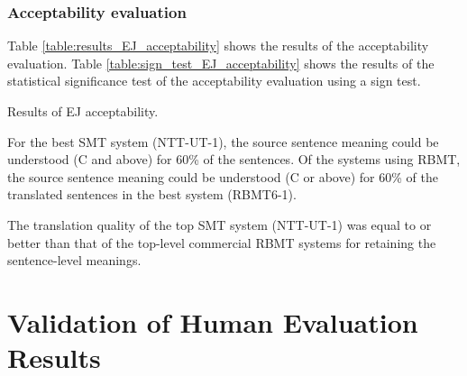 \documentclass[english]{jnlp_1.4}
\begin{document}
\subsubsection{Acceptability evaluation}

Table \ref{table:results_EJ_acceptability} shows the results of the acceptability evaluation. 
Table \ref{table:sign_test_EJ_acceptability} shows the results of the statistical significance test of the acceptability evaluation using a sign test.

\begin{table}[t]
\caption{Results of EJ acceptability.}
\label{table:results_EJ_acceptability}

\end{table}
\begin{table}[t]
\label{table:sign_test_EJ_acceptability}

\end{table}

For the best SMT system (NTT-UT-1), the source sentence meaning could be understood (C and above) for 60\% of the sentences.
Of the systems using RBMT, the source sentence meaning could be understood (C or above) for 60\% of the translated sentences in the best system (RBMT6-1).

The translation quality of the top SMT system (NTT-UT-1) was equal to or better than that of the top-level commercial RBMT systems for retaining the sentence-level meanings. 


\section{Validation of Human Evaluation Results}
\label{sec:validation_human_evaluation}
\end{document}
